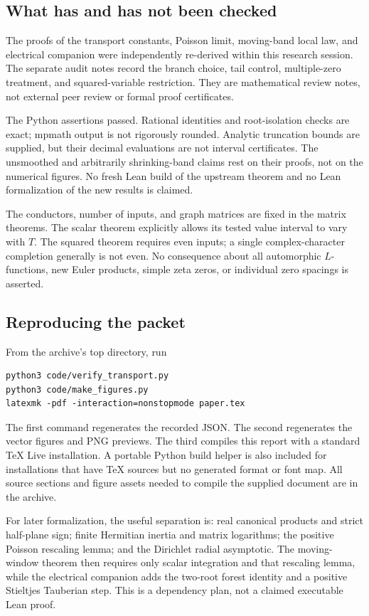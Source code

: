 \subsection{What has and has not been checked}

The proofs of the transport constants, Poisson limit, moving-band local
law, and electrical companion were independently re-derived within this
research session.  The separate audit notes record the branch choice,
tail control, multiple-zero treatment, and squared-variable restriction.
They are mathematical review notes, not external peer review or formal
proof certificates.

The Python assertions passed.  Rational identities and root-isolation
checks are exact; mpmath output is not rigorously rounded.  Analytic
truncation bounds are supplied, but their decimal evaluations are not
interval certificates.  The unsmoothed and arbitrarily shrinking-band
claims rest on their proofs, not on the numerical figures.  No fresh
Lean build of the upstream theorem and no Lean formalization of the new
results is claimed.

The conductors, number of inputs, and graph matrices are fixed in the
matrix theorems.  The scalar theorem explicitly allows its tested value
interval to vary with $T$.  The squared theorem requires even inputs;
a single complex-character completion generally is not even.  No
consequence about all automorphic $L$-functions, new Euler products,
simple zeta zeros, or individual zero spacings is asserted.

\subsection{Reproducing the packet}

From the archive's top directory, run
\begin{verbatim}
python3 code/verify_transport.py
python3 code/make_figures.py
latexmk -pdf -interaction=nonstopmode paper.tex
\end{verbatim}
The first command regenerates the recorded JSON.  The second regenerates
the vector figures and PNG previews.  The third compiles this report
with a standard TeX Live installation.  A portable Python build helper
is also included for installations that have TeX sources but no generated
format or font map.  All source sections and figure assets needed to
compile the supplied document are in the archive.

For later formalization, the useful separation is: real canonical
products and strict half-plane sign; finite Hermitian inertia and matrix
logarithms; the positive Poisson rescaling lemma; and the Dirichlet
radial asymptotic.  The moving-window theorem then requires only scalar
integration and that rescaling lemma, while the electrical companion
adds the two-root forest identity and a positive Stieltjes Tauberian step.
This is a dependency plan, not a claimed executable Lean proof.
